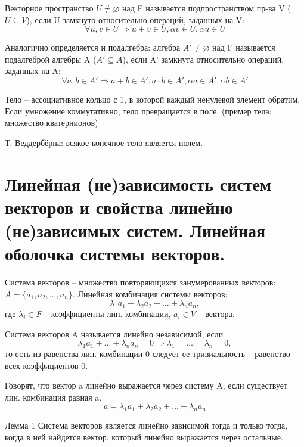 \documentclass{article}
\begin{document}
Векторное пространство $U\neq \varnothing$ над F называется \textsf{подпространством} пр-ва V ($U\subseteq V$), если U замкнуто относительно операций, заданных на V:
$$\forall u,v\in U\Rightarrow u+v\in U, \alpha v\in U, \alpha u\in U$$

Аналогично определяется и \textsf{подалгебра}:
алгебра $A'\neq \varnothing$ над F называется \textsf{подалгеброй} алгебры A ($A'\subseteq A$), если A' замкнута относительно операций, заданных на A:
$$\forall a,b\in A'\Rightarrow a+b\in A', a\cdot b\in A', \alpha a\in A', \alpha b\in A'$$

\textsf{Тело} – ассоциативное кольцо с 1, в которой каждый ненулевой элемент обратим.
Если умножение коммутативно, тело превращается в поле. (пример тела: множество кватернионов)

\textsf{Т. Веддербёрна:} всякое конечное тело является полем.

\section{Линейная (не)зависимость систем векторов и свойства линейно (не)зависимых систем. Линейная оболочка системы векторов.}

Система векторов – множество повторяющихся занумерованных векторов: $A = \{a_1,a_2,\dots,a_n\}$. Линейная комбинация системы векторов:
$$\lambda_1a_1+\lambda_2a_2+\dots+\lambda_na_n,$$
где $\lambda_i\in F$ – коэффициенты лин. комбинации, $a_i\in V$ – вектора.

Система векторов A называется \textsf{линейно независимой}, если
$$\lambda_1a_1+\dots+\lambda_na_n=0\Rightarrow \lambda_1=\dots=\lambda_n=0,$$
то есть из равенства лин. комбинации 0 следует ее тривиальность – равенство всех коэффициентов 0.

Говорят, что вектор a \textsf{линейно выражается} через систему A, если существует лин. комбинация равная a.
$$a=\lambda_1a_1+\lambda_2a_2+\dots+\lambda_na_n$$

\textsf{Лемма 1}
Система векторов является \textsf{линейно зависимой} тогда и только тогда, когда в ней найдется вектор, который линейно выражается через остальные.
\end{document}
